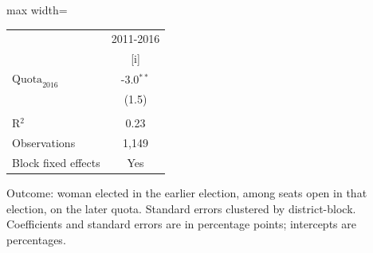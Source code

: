 
\begingroup
\centering
\scriptsize
\begin{adjustbox}{max width=\linewidth}
   \begin{threeparttable}[b]
      \begin{tabular}{lc}
         \toprule
                                & 2011-2016 \\
                                & [i]\\
         \midrule
         $\text{Quota}_{2016}$  & -3.0$^{**}$\\
                                & (1.5)\\
          \\
         R$^2$                  & 0.23\\
         Observations           & 1,149\\
         Block fixed effects    & Yes\\
         \bottomrule
      \end{tabular}

      \begin{tablenotes}
         \item Outcome: woman elected in the earlier election, among seats open in that election, on the later quota. Standard errors clustered by district-block. Coefficients and standard errors are in percentage points; intercepts are percentages.
      \end{tablenotes}
   \end{threeparttable}
\end{adjustbox}
\par\endgroup



